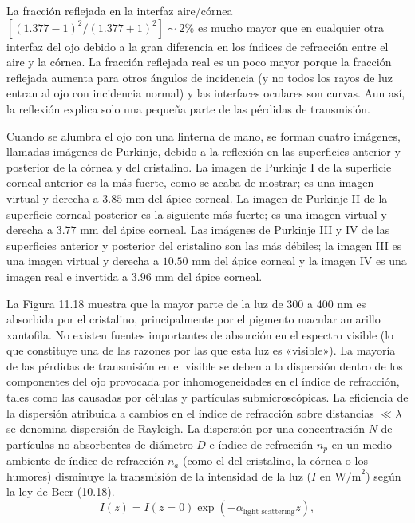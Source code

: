 \documentclass[12pt]{book}
\begin{document}
La fracción reflejada en la interfaz aire/córnea $[(1.377 - 1)^2/(1.377 + 1)^2] \sim 2\%$ es mucho mayor que en cualquier otra interfaz del ojo debido a la gran diferencia en los índices de refracción entre el aire y la córnea. La fracción reflejada real es un poco mayor porque la fracción reflejada aumenta para otros ángulos de incidencia (y no todos los rayos de luz entran al ojo con incidencia normal) y las interfaces oculares son curvas. Aun así, la reflexión explica solo una pequeña parte de las pérdidas de transmisión.

Cuando se alumbra el ojo con una linterna de mano, se forman cuatro imágenes, llamadas imágenes de Purkinje, debido a la reflexión en las superficies anterior y posterior de la córnea y del cristalino. La imagen de Purkinje I de la superficie corneal anterior es la más fuerte, como se acaba de mostrar; es una imagen virtual y derecha a $3.85\text{ mm}$ del ápice corneal. La imagen de Purkinje II de la superficie corneal posterior es la siguiente más fuerte; es una imagen virtual y derecha a $3.77\text{ mm}$ del ápice corneal. Las imágenes de Purkinje III y IV de las superficies anterior y posterior del cristalino son las más débiles; la imagen III es una imagen virtual y derecha a $10.50\text{ mm}$ del ápice corneal y la imagen IV es una imagen real e invertida a $3.96\text{ mm}$ del ápice corneal.

La Figura 11.18 muestra que la mayor parte de la luz de 300 a 400 nm es absorbida por el cristalino, principalmente por el pigmento macular amarillo xantofila. No existen fuentes importantes de absorción en el espectro visible (lo que constituye una de las razones por las que esta luz es «visible»). La mayoría de las pérdidas de transmisión en el visible se deben a la dispersión dentro de los componentes del ojo provocada por inhomogeneidades en el índice de refracción, tales como las causadas por células y partículas submicroscópicas. La eficiencia de la dispersión atribuida a cambios en el índice de refracción sobre distancias $\ll \lambda$ se denomina dispersión de Rayleigh. La dispersión por una concentración $N$ de partículas no absorbentes de diámetro $D$ e índice de refracción $n_p$ en un medio ambiente de índice de refracción $n_a$ (como el del cristalino, la córnea o los humores) disminuye la transmisión de la intensidad de la luz ($I$ en $\text{W/m}^2$) según la ley de Beer (10.18).
\begin{equation}
\label{eq:11.46}
I(z) = I(z = 0) \exp(-\alpha_{\text{light scattering}} z),
\end{equation}
\end{document}
